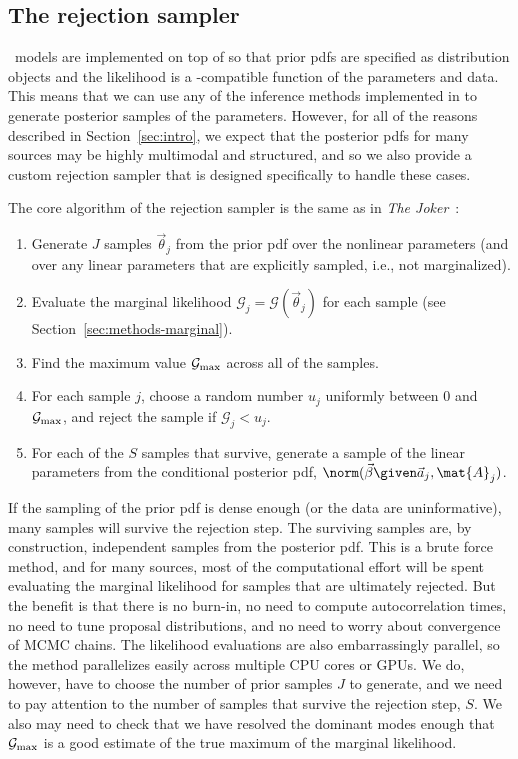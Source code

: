 \documentclass[twocolumn]{AASTeX7/aastex701}
\newcommand{\harv}{\package{harv}}
\newcommand{\joker}{\textsl{The Joker}}
\begin{document}
\subsection{The rejection sampler}
\label{sec:methods-rejection}

\harv\ models are implemented on top of  so that prior pdfs are
specified as  distribution objects and the likelihood is a
\jax-compatible function of the parameters and data.
This means that we can use any of the inference methods implemented in 
to generate posterior samples of the parameters.
However, for all of the reasons described in Section~\ref{sec:intro}, we expect that the
posterior pdfs for many sources may be highly multimodal and structured, and so we also
provide a custom rejection sampler that is designed specifically to handle these cases.

The core algorithm of the rejection sampler is the same as in \joker\
\citep{Price-Whelan:2017}:
\begin{enumerate}
  \item Generate $J$ samples $\vec{\theta}_j$ from the prior pdf over the nonlinear
    parameters (and over any linear parameters that are explicitly sampled, i.e., not
    marginalized).
  \item Evaluate the marginal likelihood $\mathcal{G}_j = \mathcal{G}(\vec{\theta}_j)$
  for each sample (see Section~\ref{sec:methods-marginal}).
  \item Find the maximum value $\mathcal{G}_{\rm max}$ across all of the samples.
  \item For each sample $j$, choose a random number $u_j$ uniformly between 0 and
    $\mathcal{G}_{\rm max}$, and reject the sample if $\mathcal{G}_j < u_j$.
  \item For each of the $S$ samples that survive, generate a sample of the linear
    parameters from the conditional posterior pdf,
    $\norm(\vec{\beta} \given \vec{a}_j, \mat{A}_j)$.
\end{enumerate}
If the sampling of the prior pdf is dense enough (or the data are uninformative), many
samples will survive the rejection step.
The surviving samples are, by construction, independent samples from the posterior pdf.
This is a brute force method, and for many sources, most of the computational effort
will be spent evaluating the marginal likelihood for samples that are ultimately
rejected.
But the benefit is that there is no burn-in, no need to compute autocorrelation times,
no need to tune proposal distributions, and no need to worry about convergence of
MCMC chains.
The likelihood evaluations are also embarrassingly parallel, so the method parallelizes
easily across multiple CPU cores or GPUs.
We do, however, have to choose the number of prior samples $J$ to generate, and we need
to pay attention to the number of samples that survive the rejection step, $S$.
We also may need to check that we have resolved the dominant modes enough that
$\mathcal{G}_{\rm max}$ is a good estimate of the true maximum of the marginal
likelihood.
\end{document}
